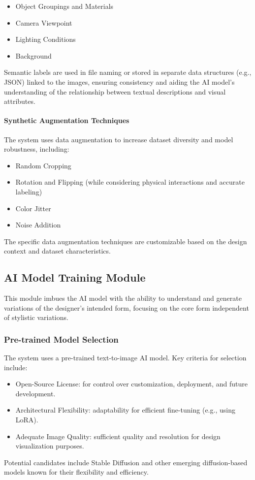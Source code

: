 \documentclass[12pt]{report}
\begin{document}
\begin{itemize}
    \item Object Groupings and Materials
    \item Camera Viewpoint
    \item Lighting Conditions
    \item Background
\end{itemize}

Semantic labels are used in file naming or stored in separate data structures (e.g., JSON) linked to the images, ensuring consistency and aiding the AI model's understanding of the relationship between textual descriptions and visual attributes.

\paragraph{Synthetic Augmentation Techniques}

The system uses data augmentation to increase dataset diversity and model robustness, including:

\begin{itemize}
    \item Random Cropping
    \item Rotation and Flipping (while considering physical interactions and accurate labeling)
    \item Color Jitter
    \item Noise Addition 
\end{itemize}

The specific data augmentation techniques are customizable based on the design context and dataset characteristics.

\subsection{AI Model Training Module}
This module imbues the AI model with the ability to understand and generate variations of the designer's intended form, focusing on the core form independent of stylistic variations.

\subsubsection{Pre-trained Model Selection}
The system uses a pre-trained text-to-image AI model. Key criteria for selection include:
\begin{itemize}
    \item Open-Source License: for control over customization, deployment, and future development.
    \item Architectural Flexibility: adaptability for efficient fine-tuning (e.g., using LoRA).
    \item Adequate Image Quality: sufficient quality and resolution for design visualization purposes.
\end{itemize}
Potential candidates include Stable Diffusion and other emerging diffusion-based models known for their flexibility and efficiency.
\end{document}
